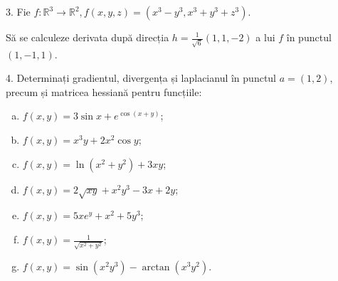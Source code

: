 \documentclass[11pt,a4paper]{article}
\newcommand\RR{\mathbb{R}}
\theoremstyle{dotless}
\theoremstyle{dotlessdr}
\begin{document}
3. Fie $f : \RR^3 \to \RR^2, f(x, y, z) = (x^3 - y^3, x^3 + y^3 + z^3)$.

Să se calculeze derivata după direcția $h = \frac{1}{\sqrt{6}} (1, 1, -2)$ a lui $f$ în
punctul $(1, -1, 1)$.

\vspace{1cm}

4. Determinați gradientul, divergența  și laplacianul în punctul
$a = (1, 2)$, precum și matricea hessiană pentru funcțiile:
\begin{enumerate}[(a)]
\item $f(x, y) = 3\sin x + e^{\cos(x + y)}$;
\item $f(x, y) = x^3 y + 2x^2\cos y$;
\item $f(x, y) = \ln(x^2 + y^2) + 3xy$;
\item $f(x, y) = 2\sqrt{xy} + x^2y^3 - 3x + 2y$;
\item $f(x, y) = 5xe^y + x^2 + 5y^3$;
\item $f(x, y) = \frac{1}{\sqrt{x^2 + y^2}}$;
\item $f(x, y) = \sin(x^2y^3) - \arctan (x^3 y^2)$.
\end{enumerate}
\end{document}
